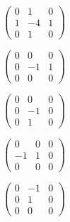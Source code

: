 \documentclass[a4paper,10pt]{article}
\begin{document}
\begin{equation*}
\begin{pmatrix}
0 & 1 & 0 \\
1 & -4 & 1\\
0 & 1 & 0
\end{pmatrix}
\end{equation*}

\begin{figure}[H]
  \begin{minipage}[b]{0.5\linewidth}
    \centering

    \begin{equation*}
    \begin{pmatrix}
    0 & 0 & 0 \\
    0 & -1 & 1\\
    0 & 0 & 0
    \end{pmatrix}
    \end{equation*}

  \end{minipage}
    \hspace{0.5cm}
  \begin{minipage}[b]{0.5\linewidth}

    \begin{equation*}
    \begin{pmatrix}
    0 & 0 & 0 \\
    0 & -1 & 0\\
    0 & 1 & 0
    \end{pmatrix}
    \end{equation*}
  \end{minipage}
\end{figure}

\begin{figure}[H]
  \begin{minipage}[b]{0.5\linewidth}
    \centering

    \begin{equation*}
    \begin{pmatrix}
    0 & 0 & 0 \\
    -1 & 1 & 0\\
    0 & 0 & 0
    \end{pmatrix}
    \end{equation*}

  \end{minipage}
    \hspace{0.5cm}
  \begin{minipage}[b]{0.5\linewidth}

    \begin{equation*}
    \begin{pmatrix}
    0 & -1 & 0 \\
    0 & 1 & 0\\
    0 & 0 & 0
    \end{pmatrix}
    \end{equation*}

  \end{minipage}
\end{figure}
\end{document}
